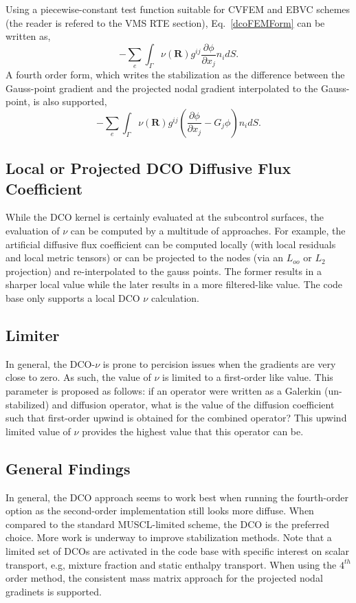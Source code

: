 Using a piecewise-constant test function suitable for CVFEM and EBVC schemes (the reader is refered to 
the VMS RTE section), Eq.~\ref{dcoFEMForm} can be written as,
\begin{equation}
  -\sum_e \int_\Gamma \nu(\mathbf{R}) g^{ij} \frac{\partial \phi} {\partial x_j} n_i dS.
\label{dcoFVForm}
\end{equation}
%
A fourth order form, which writes the stabilization as the difference between the Gauss-point gradient 
and the projected nodal gradient interpolated to the Gauss-point, is also supported,
\begin{equation}
  -\sum_e \int_\Gamma \nu(\mathbf{R}) g^{ij} (\frac{\partial \phi} {\partial x_j} - G_j \phi ) n_i dS.
\label{dcoFVForm4th}
\end{equation}

\subsection{Local or Projected DCO Diffusive Flux Coefficient}
While the DCO kernel is certainly evaluated at the subcontrol surfaces, the evaluation of $\nu$ can be 
computed by a multitude of approaches. For example, the artificial diffusive flux coefficient 
can be computed locally (with local residuals and local metric tensors) or can be projected 
to the nodes (via an $L_{oo}$ or $L_2$ projection) and re-interpolated to the gauss points. 
The former results in a sharper local value while the later results in a more filtered-like value.
The code base only supports a local DCO $\nu$ calculation.

\subsection{Limiter}
In general, the DCO-$\nu$ is prone to percision issues when the gradients are very close to zero. As such, the 
value of $\nu$ is limited to a first-order like value. This parameter is proposed as follows: if an operator
were written as a Galerkin (un-stabilized) and diffusion operator, what is the value of the diffusion coefficient
such that first-order upwind is obtained for the combined operator? This upwind limited value of $\nu$ provides the
highest value that this operator can be.

\subsection{General Findings}
In general, the DCO approach seems to work best when running the fourth-order option as the second-order 
implementation still looks more diffuse. When compared to the standard MUSCL-limited scheme, the DCO
is the preferred choice. More work is underway to improve stabilization methods.
Note that a limited set of DCOs are activated in the code base with specific
interest on scalar transport, e.g, mixture fraction and static enthalpy transport. When using the $4^{th}$ order method, the consistent mass matrix approach 
for the projected nodal gradinets is supported.
